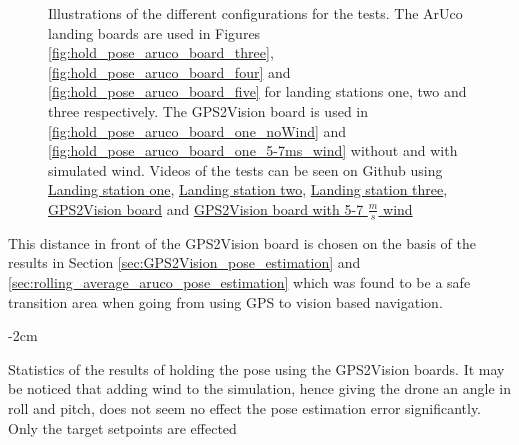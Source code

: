 \documentclass[../Head/report.tex]{subfiles}
\begin{document}
\begin{figure}[H]
    \caption{Illustrations of the different configurations for the tests. The ArUco landing boards are used in Figures \ref{fig:hold_pose_aruco_board_three}, \ref{fig:hold_pose_aruco_board_four} and \ref{fig:hold_pose_aruco_board_five} for landing stations one, two and three respectively. The GPS2Vision board is used in \ref{fig:hold_pose_aruco_board_one_noWind} and \ref{fig:hold_pose_aruco_board_one_5-7ms_wind} without and with simulated wind. Videos of the tests can be seen on Github using \href{https://github.com/Kenil16/master_project/tree/master/test_videos/analyse_hold_pose_using_aruco_pose_estimation_landing_station1}{Landing station one}, \href{https://github.com/Kenil16/master_project/tree/master/test_videos/analyse_hold_pose_using_aruco_pose_estimation_landing_station2}{Landing station two}, \href{https://github.com/Kenil16/master_project/tree/master/test_videos/analyse_hold_pose_using_aruco_pose_estimation_landing_station3}{Landing station three}, \href{https://github.com/Kenil16/master_project/tree/master/test_videos/analyse_hold_pose_using_aruco_pose_estimation_gps2vision_noWind}{GPS2Vision board} and  \href{https://github.com/Kenil16/master_project/tree/master/test_videos/analyse_hold_pose_using_aruco_pose_estimation_gps2vision_5-7ms_wind}{GPS2Vision board with 5-7 $\frac{m}{s}$ wind}}
    \label{fig:hold_pose_aruco_boards}
\end{figure}

This distance in front of the GPS2Vision board is chosen on the basis of the results in Section \ref{sec:GPS2Vision_pose_estimation} and \ref{sec:rolling_average_aruco_pose_estimation} which was found to be a safe transition area when going from using GPS to vision based navigation.   

\begin{table}[H]
    \centering
    \addtolength{\leftskip} {-2cm}
    \addtolength{\rightskip}{-2cm}
        \caption{Statistics of the results of holding the pose using the GPS2Vision boards. It may be noticed that adding wind to the simulation, hence giving the drone an angle in roll and pitch, does not seem no effect the pose estimation error significantly. Only the target setpoints are effected}
 \label{tab:hold_pose_using_gps2vision_board}
\end{table}
\end{document}
